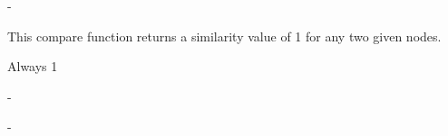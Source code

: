 
\precondition
-

\semantics
This compare function returns a similarity value of 1 for any two given nodes.

\returnvalue
Always 1

\parameters
-

\exceptions
-

\test
